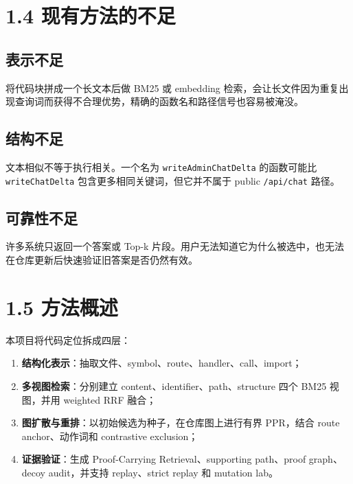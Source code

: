 \documentclass[UTF8,12pt,openany]{ctexbook}
\begin{document}
\section{1.4 现有方法的不足}

\subsection{表示不足}

将代码块拼成一个长文本后做 BM25 或 embedding 检索，会让长文件因为重复出现查询词而获得不合理优势，精确的函数名和路径信号也容易被淹没。\par

\subsection{结构不足}

文本相似不等于执行相关。一个名为 \texttt{writeAdminChatDelta} 的函数可能比 \texttt{writeChatDelta} 包含更多相同关键词，但它并不属于 public \texttt{/api/chat} 路径。\par

\subsection{可靠性不足}

许多系统只返回一个答案或 Top-k 片段。用户无法知道它为什么被选中，也无法在仓库更新后快速验证旧答案是否仍然有效。\par

\section{1.5 方法概述}

本项目将代码定位拆成四层：\par

\begin{enumerate}
\item \textbf{结构化表示}：抽取文件、symbol、route、handler、call、import；
\item \textbf{多视图检索}：分别建立 content、identifier、path、structure 四个 BM25 视图，并用 weighted RRF 融合；
\item \textbf{图扩散与重排}：以初始候选为种子，在仓库图上进行有界 PPR，结合 route anchor、动作词和 contrastive exclusion；
\item \textbf{证据验证}：生成 Proof-Carrying Retrieval、supporting path、proof graph、decoy audit，并支持 replay、strict replay 和 mutation lab。
\end{enumerate}
\end{document}
